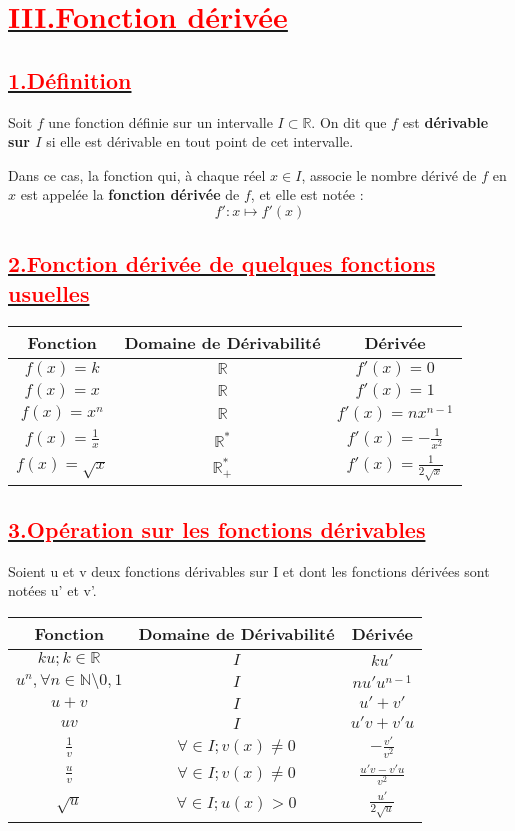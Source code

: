 \documentclass[12pt]{article}
\begin{document}
\section*{\underline{\textbf{\textcolor{red}{III.Fonction dérivée}}}}
\subsection*{\underline{\textbf{\textcolor{red}{1.Définition}}}}
Soit \( f \) une fonction définie sur un intervalle \( I \subset \mathbb{R} \). On dit que \( f \) est \textbf{dérivable sur \( I \)} si elle est dérivable en tout point de cet intervalle.

Dans ce cas, la fonction qui, à chaque réel \( x \in I \), associe le nombre dérivé de \( f \) en \( x \) est appelée la \textbf{fonction dérivée} de \( f \), et elle est notée :
\[
f' : x \mapsto f'(x)
\]
\subsection*{\underline{\textbf{\textcolor{red}{2.Fonction dérivée de quelques fonctions usuelles}}}}
\begin{center}
\begin{tabular}{|c|c|c|}
\hline
Fonction &Domaine de Dérivabilité &  Dérivée   \\
\hline
$f(x) = k$& $\mathbb{R}$ & $f'(x)=0$ \\
\hline
$f(x) = x$& $\mathbb{R}$ & $f'(x) = 1$ \\
\hline
$f(x) = x^{n}$& $\mathbb{R}$ & $f'(x) = nx^{n-1}$ \\
\hline
$f(x) = \frac{1}{x}$& $\mathbb{R}^{*}$ & $f'(x) = -\frac{1}{x^{2}}$ \\
\hline
$f(x) = \sqrt{x}$& $\mathbb{R}^{*}_{+}$ & $f'(x) = \frac{1}{2\sqrt{x}}$ \\
\hline
\end{tabular}
\end{center}
\subsection*{\underline{\textbf{\textcolor{red}{3.Opération sur les fonctions dérivables}}}}
Soient u et v deux fonctions dérivables sur I et dont les fonctions dérivées sont notées u' et v'.
\begin{center}
\begin{tabular}{|c|c|c|}
\hline
Fonction &Domaine de Dérivabilité &  Dérivée   \\
\hline
$ku;k\in \mathbb{R}$& $I$ & $ku'$ \\
\hline
$u^{n}, \forall n \in \mathbb{N}\setminus{0,1}$ & $I$ &$nu'u^{n-1}$\\
\hline
$u+v$& $I$ & $u'+v'$ \\
\hline
$uv$& $I$ & $u'v+v'u$ \\
\hline
$\frac{1}{v}$& $\forall \in I; v(x) \neq 0$ & $-\frac{v'}{v^{2}}$ \\
\hline
$\frac{u}{v}$& $\forall \in I; v(x) \neq 0$ & $\frac{u'v-v'u}{v^{2}}$ \\
\hline
$\sqrt{u}$& $\forall \in I; u(x) > 0$ & $\frac{u'}{2\sqrt{u}}$ \\
\hline
\end{tabular}
\end{center}
\end{document}
